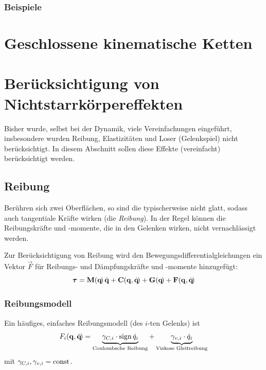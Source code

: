 			\subsubsection{Beispiele} %

	\section{Geschlossene kinematische Ketten} %

	\section{Berücksichtigung von Nichtstarrkörpereffekten}
		Bisher wurde, selbst bei der Dynamik, viele Vereinfachungen eingeführt, insbesondere wurden Reibung, Elastizitäten und Loser (Gelenkspiel) nicht berücksichtigt. In diesem Abschnitt sollen diese Effekte (vereinfacht) berücksichtigt werden.

		\subsection{Reibung}
			Berühren sich zwei Oberflächen, so sind die typischerweise nicht glatt, sodass auch tangentiale Kräfte wirken (die \emph{Reibung}). In der Regel können die Reibungskräfte und -momente, die in den Gelenken wirken, nicht vernachlässigt werden.
			
			Zur Berücksichtigung von Reibung wird den Bewegungsdifferentialgleichungen \INVDYN ein Vektor \( \vec{F} \) für Reibungs- und Dämpfungskräfte und -momente hinzugefügt:
			\begin{equation*}
				\boldsymbol{\mathrm{\tau}} = \boldsymbol{\mathrm{M}}(\boldsymbol{\mathrm{q}}\!)\, \ddot{\boldsymbol{\mathrm{q}}} + \boldsymbol{\mathrm{C}}(\boldsymbol{\mathrm{q}}, \dot{\boldsymbol{\mathrm{q}}}\!) + \boldsymbol{\mathrm{G}}(\boldsymbol{\mathrm{q}}\!) + \boldsymbol{\mathrm{F}}(\boldsymbol{\mathrm{q}}, \dot{\boldsymbol{\mathrm{q}}}\!)
			\end{equation*}
			
			\subsubsection{Reibungsmodell}
				Ein häufiges, einfaches Reibungsmodell (des \(i\)-ten Gelenks) ist
				\begin{equation*}
					F_i(\boldsymbol{\mathrm{q}}, \dot{\boldsymbol{\mathrm{q}}}\!) = \underbrace{\gamma_{C, i} \cdot \operatorname{sign} \dot{q}_i}_\text{Coulombsche Reibung} + \underbrace{\gamma_{v, i} \cdot \dot{q}_i}_\text{Viskose Gleitreibung}
				\end{equation*}
				mit \( \gamma_{C, i}, \gamma_{v, i} = \operatorname{const} \).
				
